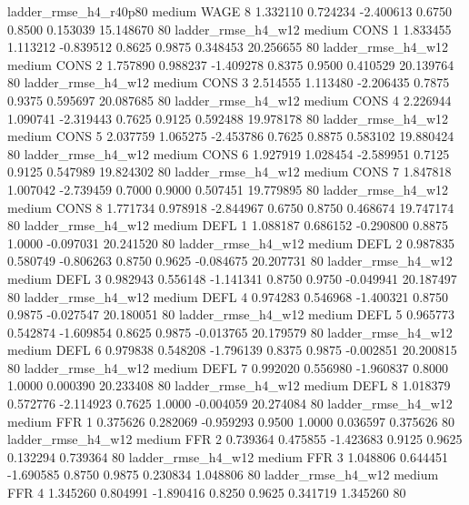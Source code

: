  ladder_rmse_h4_r40p80     medium     WAGE                 8  1.332110 0.724234 -2.400613 0.6750 0.8500  0.153039   15.148670 80
    ladder_rmse_h4_w12     medium     CONS                 1  1.833455 1.113212 -0.839512 0.8625 0.9875  0.348453   20.256655 80
    ladder_rmse_h4_w12     medium     CONS                 2  1.757890 0.988237 -1.409278 0.8375 0.9500  0.410529   20.139764 80
    ladder_rmse_h4_w12     medium     CONS                 3  2.514555 1.113480 -2.206435 0.7875 0.9375  0.595697   20.087685 80
    ladder_rmse_h4_w12     medium     CONS                 4  2.226944 1.090741 -2.319443 0.7625 0.9125  0.592488   19.978178 80
    ladder_rmse_h4_w12     medium     CONS                 5  2.037759 1.065275 -2.453786 0.7625 0.8875  0.583102   19.880424 80
    ladder_rmse_h4_w12     medium     CONS                 6  1.927919 1.028454 -2.589951 0.7125 0.9125  0.547989   19.824302 80
    ladder_rmse_h4_w12     medium     CONS                 7  1.847818 1.007042 -2.739459 0.7000 0.9000  0.507451   19.779895 80
    ladder_rmse_h4_w12     medium     CONS                 8  1.771734 0.978918 -2.844967 0.6750 0.8750  0.468674   19.747174 80
    ladder_rmse_h4_w12     medium     DEFL                 1  1.088187 0.686152 -0.290800 0.8875 1.0000 -0.097031   20.241520 80
    ladder_rmse_h4_w12     medium     DEFL                 2  0.987835 0.580749 -0.806263 0.8750 0.9625 -0.084675   20.207731 80
    ladder_rmse_h4_w12     medium     DEFL                 3  0.982943 0.556148 -1.141341 0.8750 0.9750 -0.049941   20.187497 80
    ladder_rmse_h4_w12     medium     DEFL                 4  0.974283 0.546968 -1.400321 0.8750 0.9875 -0.027547   20.180051 80
    ladder_rmse_h4_w12     medium     DEFL                 5  0.965773 0.542874 -1.609854 0.8625 0.9875 -0.013765   20.179579 80
    ladder_rmse_h4_w12     medium     DEFL                 6  0.979838 0.548208 -1.796139 0.8375 0.9875 -0.002851   20.200815 80
    ladder_rmse_h4_w12     medium     DEFL                 7  0.992020 0.556980 -1.960837 0.8000 1.0000  0.000390   20.233408 80
    ladder_rmse_h4_w12     medium     DEFL                 8  1.018379 0.572776 -2.114923 0.7625 1.0000 -0.004059   20.274084 80
    ladder_rmse_h4_w12     medium      FFR                 1  0.375626 0.282069 -0.959293 0.9500 1.0000  0.036597    0.375626 80
    ladder_rmse_h4_w12     medium      FFR                 2  0.739364 0.475855 -1.423683 0.9125 0.9625  0.132294    0.739364 80
    ladder_rmse_h4_w12     medium      FFR                 3  1.048806 0.644451 -1.690585 0.8750 0.9875  0.230834    1.048806 80
    ladder_rmse_h4_w12     medium      FFR                 4  1.345260 0.804991 -1.890416 0.8250 0.9625  0.341719    1.345260 80

